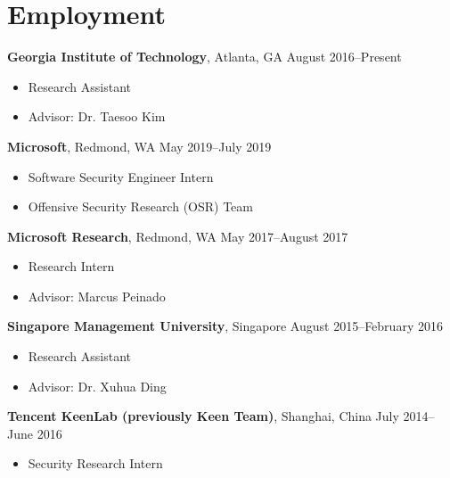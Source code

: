 \section*{Employment}

\begin{description}
\item {\bf Georgia Institute of Technology}, Atlanta, GA
\dotfill August 2016--Present
  \begin{itemize}
  \item Research Assistant
  \item Advisor: Dr. Taesoo Kim
  \end{itemize}

 \item {\bf Microsoft}, Redmond, WA \dotfill May 2019--July 2019
  \begin{itemize}
  \item Software Security Engineer Intern
  \item Offensive Security Research (OSR) Team
  \end{itemize}
 
\item {\bf Microsoft Research}, Redmond, WA \dotfill May 2017--August 2017
  \begin{itemize}
  \item Research Intern
  \item Advisor: Marcus Peinado
  \end{itemize}

\item {\bf Singapore Management University}, Singapore \dotfill August 2015--February 2016
  \begin{itemize}
  \item Research Assistant
  \item Advisor: Dr. Xuhua Ding
  \end{itemize}

\item {\bf Tencent KeenLab (previously Keen Team)}, Shanghai, China \dotfill July 2014--June 2016
	\begin{itemize}
	\item Security Research Intern
	\end{itemize}
\end{description}
